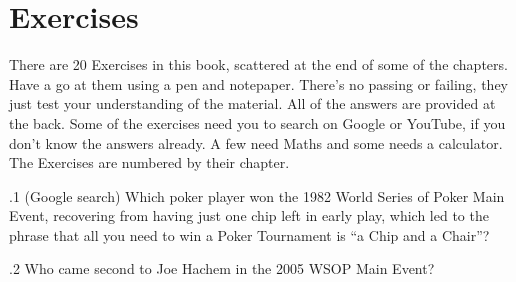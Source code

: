 \section{Exercises}


There are 20 Exercises in this book, scattered at the end of some of
the chapters. Have a go at them using a pen and notepaper. There's no
passing or failing, they just test your understanding of the
material. All of the answers are provided at the back. Some of the
exercises need you to search on Google or YouTube, if you don't know
the answers already. A few need Maths and some needs a calculator. The
Exercises are numbered by their chapter.

.1 (Google search) Which poker player won the 1982 World
Series of Poker Main Event, recovering from having just one chip
left in early play, which led to the phrase that all you need to win a
Poker Tournament is ``a Chip and a Chair''?

.2 Who came second to Joe Hachem in the 2005 WSOP
Main Event?





